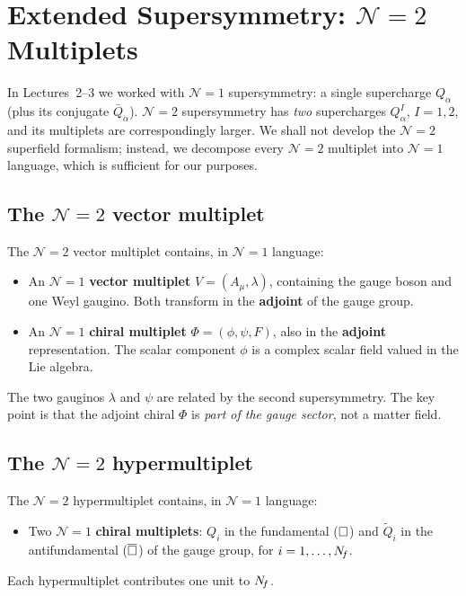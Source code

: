 \documentclass[11pt,a4paper]{article}
\begin{document}
\section{Extended Supersymmetry: $\mathcal{N}=2$ Multiplets}
\label{sec:multiplets}

In Lectures~2--3 we worked with $\mathcal{N}=1$ supersymmetry: a single
supercharge $Q_\alpha$ (plus its conjugate $\bar{Q}_{\dot\alpha}$).
$\mathcal{N}=2$ supersymmetry has \emph{two} supercharges $Q_\alpha^I$,
$I = 1,2$, and its multiplets are correspondingly larger.  We shall
not develop the $\mathcal{N}=2$ superfield formalism; instead, we
decompose every $\mathcal{N}=2$ multiplet into $\mathcal{N}=1$ language,
which is sufficient for our purposes.

\subsection{The $\mathcal{N}=2$ vector multiplet}

The $\mathcal{N}=2$ vector multiplet contains, in $\mathcal{N}=1$
language:
\begin{itemize}
  \item An $\mathcal{N}=1$ \textbf{vector multiplet} $V = (A_\mu, \lambda)$,
    containing the gauge boson and one Weyl gaugino.  Both transform in the
    \textbf{adjoint} of the gauge group.
  \item An $\mathcal{N}=1$ \textbf{chiral multiplet}
    $\Phi = (\phi, \psi, F)$, also in the \textbf{adjoint}
    representation.  The scalar component $\phi$ is a complex scalar field
    valued in the Lie algebra.
\end{itemize}
The two gauginos $\lambda$ and $\psi$ are related by the second
supersymmetry.  The key point is that the adjoint chiral
$\Phi$ is \emph{part of the gauge sector}, not a matter field.

\subsection{The $\mathcal{N}=2$ hypermultiplet}

The $\mathcal{N}=2$ hypermultiplet contains, in $\mathcal{N}=1$ language:
\begin{itemize}
  \item Two $\mathcal{N}=1$ \textbf{chiral multiplets}: $Q_i$ in the
    fundamental ($\square$) and $\widetilde{Q}_i$ in the antifundamental
    ($\overline{\square}$) of the gauge group, for $i = 1,\ldots,N_{\!f}$.
\end{itemize}
Each hypermultiplet contributes one unit to $N_{\!f}$.
\end{document}
